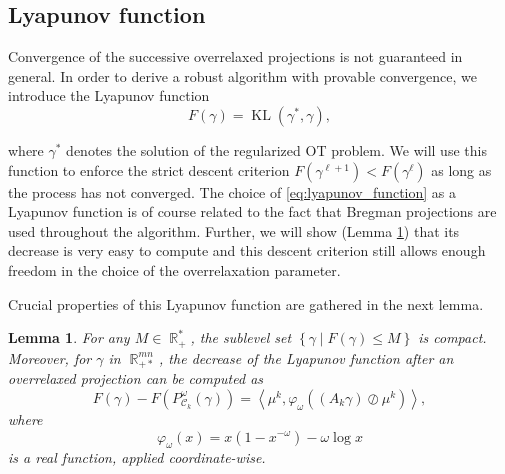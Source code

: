 \documentclass{article} %
\newcommand{\scal}[2]{\left\langle #1 , #2 \right\rangle}
\DeclareMathOperator{\IR}{\mathbb{R}}
\DeclareMathOperator{\Ccal}{\mathcal{C}}
\DeclareMathOperator{\KL}{KL}
\theoremstyle{plain}
\newtheorem{proposition}{Proposition}
\newtheorem{lemma}{Lemma}
\theoremstyle{definition}
\theoremstyle{remark}
\begin{document}
\subsection{Lyapunov function}
Convergence of the successive overrelaxed projections is not guaranteed in general. In order to derive a robust algorithm with provable convergence, we introduce the Lyapunov function 
\begin{equation}\label{eq:lyapunov_function}
F(\gamma) = \KL(\gamma^*, \gamma),
\end{equation}

where $\gamma^*$ denotes the solution of the regularized OT problem. We will use this function to enforce the strict descent criterion $F(\gamma^{\ell+1}) < F(\gamma^\ell)$ as long as the process has not converged.
%
The choice of \eqref{eq:lyapunov_function} as a Lyapunov function is of course related to the fact that Bregman projections are used throughout the algorithm. Further, we will show (Lemma \ref{lemma:lyapunov_decrease}) that its decrease is very easy to compute and this descent criterion still allows enough freedom in the choice of the overrelaxation parameter.

Crucial properties of this Lyapunov function are gathered in the next lemma.
\begin{lemma} \label{lemma:lyapunov_decrease}
	For any $M \in \IR_+^*$, the sublevel set $\left\{ \gamma \mid F(\gamma) \le M \right\}$ is compact.
	Moreover, for $\gamma$ in $\IR^{mn}_{+*}$, the decrease of the Lyapunov function after an overrelaxed projection can be computed as
	\begin{equation} \label{eq:kl_diff_scal}
	F(\gamma) - F(P^\omega_{\Ccal_k}(\gamma)) = 
	\scal{\mu^k}{\varphi_\omega \left((A_k \gamma) \oslash \mu^k \right)},
	\end{equation}
	where
	\begin{equation}
	\varphi_\omega(x) = x(1-x^{-\omega}) - \omega \log x
	\end{equation}
	is a real function, applied coordinate-wise.
\end{lemma}
\end{document}
